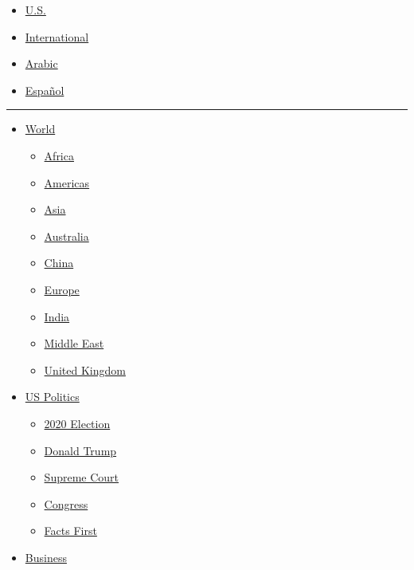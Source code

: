 \begin{itemize}
\tightlist
\item
  \href{//us.cnn.com?hpt=header?hpt=header_edition-picker}{U.S.}
\item
  \href{//edition.cnn.com?hpt=header?hpt=header_edition-picker}{International}
\item
  \href{//arabic.cnn.com?hpt=header?hpt=header_edition-picker}{Arabic}
\item
  \href{//cnnespanol.cnn.com/?hpt=header?hpt=header_edition-picker}{Español}
\end{itemize}

\begin{center}\rule{0.5\linewidth}{\linethickness}\end{center}

\begin{itemize}
\tightlist
\item
  \href{/world}{World}

  \begin{itemize}
  \tightlist
  \item
    \href{/africa}{Africa}
  \item
    \href{/americas}{Americas}
  \item
    \href{/asia}{Asia}
  \item
    \href{/australia}{Australia}
  \item
    \href{/china}{China}
  \item
    \href{/europe}{Europe}
  \item
    \href{/india}{India}
  \item
    \href{/middle-east}{Middle East}
  \item
    \href{/uk}{United Kingdom}
  \end{itemize}
\item
  \href{/politics}{US Politics}

  \begin{itemize}
  \tightlist
  \item
    \href{/election/2020}{2020 Election}
  \item
    \href{/specials/politics/president-donald-trump-45}{Donald Trump}
  \item
    \href{/specials/politics/supreme-court-nine}{Supreme Court}
  \item
    \href{/specials/politics/congress}{Congress}
  \item
    \href{/specials/politics/fact-check-politics}{Facts First}
  \end{itemize}
\item
  \href{/business}{Business}


\end{itemize}
